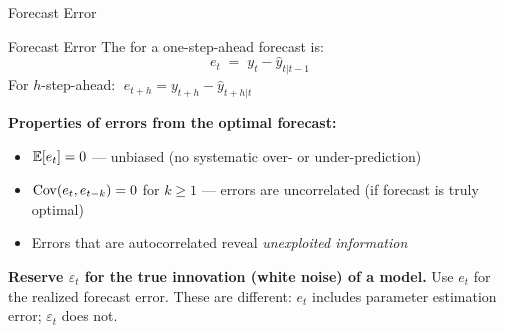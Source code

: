 \documentclass[aspectratio=169, 11pt]{beamer}
\begin{document}
\begin{frame}{Forecast Error}
  \begin{definitionbox}{Forecast Error}
    The  for a one-step-ahead forecast is:
    \[
      e_t \;=\; y_t - \hat{y}_{t|t-1}
    \]
    For $h$-step-ahead: $\;e_{t+h} = y_{t+h} - \hat{y}_{t+h|t}$
  \end{definitionbox}
  \textbf{Properties of errors from the optimal forecast:}
  \begin{itemize}
    \item $\mathbb{E}[e_t] = 0$ --- unbiased (no systematic over- or under-prediction)
    \item $\operatorname{Cov}(e_t, e_{t-k}) = 0$ for $k \geq 1$ ---
          errors are uncorrelated (if forecast is truly optimal)
    \item Errors that are autocorrelated reveal \emph{unexploited information}
  \end{itemize}
  \begin{warningbox}
    \textbf{Reserve $\varepsilon_t$ for the true innovation (white noise) of a model.}
    Use $e_t$ for the realized forecast error.
    These are different: $e_t$ includes parameter estimation error; $\varepsilon_t$ does not.
  \end{warningbox}
\end{frame}
\end{document}
